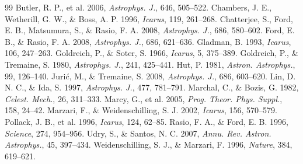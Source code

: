 \documentclass[11pt,a4paper]{article}
\begin{document}
\begin{thebibliography}{99}
 Butler, R. P., et al. 2006, \textit{Astrophys. J.}, 646, 505--522.
 Chambers, J. E., Wetherill, G. W., \& Boss, A. P. 1996, \textit{Icarus}, 119, 261--268.
 Chatterjee, S., Ford, E. B., Matsumura, S., \& Rasio, F. A. 2008, \textit{Astrophys. J.}, 686, 580--602.
 Ford, E. B., \& Rasio, F. A. 2008, \textit{Astrophys. J.}, 686, 621--636.
 Gladman, B. 1993, \textit{Icarus}, 106, 247--263.
 Goldreich, P., \& Soter, S. 1966, \textit{Icarus}, 5, 375--389.
 Goldreich, P., \& Tremaine, S. 1980, \textit{Astrophys. J.}, 241, 425--441.
 Hut, P. 1981, \textit{Astron. Astrophys.}, 99, 126--140.
 Juri\'c, M., \& Tremaine, S. 2008, \textit{Astrophys. J.}, 686, 603--620.
 Lin, D. N. C., \& Ida, S. 1997, \textit{Astrophys. J.}, 477, 781--791.
 Marchal, C., \& Bozis, G. 1982, \textit{Celest. Mech.}, 26, 311--333.
 Marcy, G., et al. 2005, \textit{Prog. Theor. Phys. Suppl.}, 158, 24--42.
 Marzari, F., \& Weidenschilling, S. J. 2002, \textit{Icarus}, 156, 570--579.
 Pollack, J. B., et al. 1996, \textit{Icarus}, 124, 62--85.
 Rasio, F. A., \& Ford, E. B. 1996, \textit{Science}, 274, 954--956.
 Udry, S., \& Santos, N. C. 2007, \textit{Annu. Rev. Astron. Astrophys.}, 45, 397--434.
 Weidenschilling, S. J., \& Marzari, F. 1996, \textit{Nature}, 384, 619--621.
\end{thebibliography}
\end{document}
